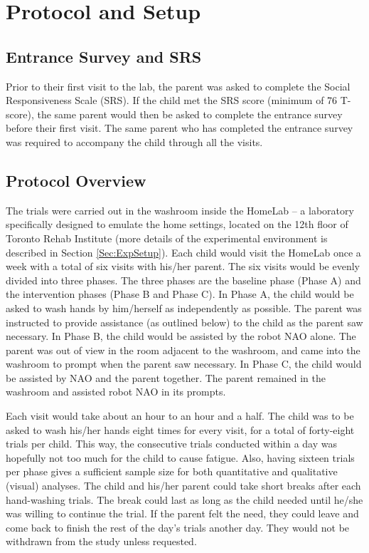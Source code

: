 \section{Protocol and Setup}


\subsection{Entrance Survey and SRS}
Prior to their first visit to the lab, the parent was asked to complete the Social Responsiveness Scale (SRS). If the child met the SRS score (minimum of 76 T-score), the same parent would then be asked to complete the entrance survey before their first visit. The same parent who has completed the entrance survey was required to accompany the child through all the visits.


\subsection{Protocol Overview}
\label{sec:ProtocolOverview}
The trials were carried out in the washroom inside the HomeLab -- a laboratory specifically designed to emulate the home settings, located on the 12th floor of Toronto Rehab Institute (more details of the experimental environment is described in Section \ref{Sec:ExpSetup}).  Each child would visit the HomeLab once a week with a total of six visits with his/her parent. The six visits would be evenly divided into three phases. The three phases are the baseline phase (Phase A) and the intervention phases (Phase B and Phase C). In Phase A, the child would be asked to wash hands by him/herself as independently as possible. The parent was instructed to provide assistance (as outlined below) to the child as the parent saw necessary.  In Phase B, the child would be assisted by the robot NAO alone.  The parent was out of view in the room adjacent to the washroom, and came into the washroom to prompt when the parent saw necessary.  In Phase C, the child would be assisted by NAO and the parent together.  The parent remained in the washroom and assisted robot NAO in its prompts.

Each visit would take about an hour to an hour and a half. The child was to be asked to wash his/her hands eight times for every visit, for a total of forty-eight trials per child.  This way, the consecutive trials conducted within a day was hopefully not too much for the child to cause fatigue.  Also, having sixteen trials per phase gives a sufficient sample size for both quantitative and qualitative (visual) analyses.  The child and his/her parent could take short breaks after each hand-washing trials.  The break could last as long as the child needed until he/she was willing to continue the trial. If the parent felt the need, they could leave and come back to finish the rest of the day's trials another day. They would not be withdrawn from the study unless requested.

